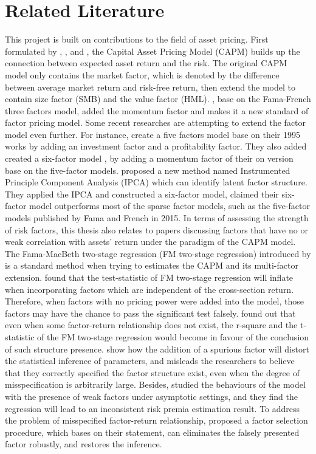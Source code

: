 	\chapter{Related Literature}\label{Literature}
This project is built on contributions to the field of asset pricing.
First formulated by , , and , the Capital Asset Pricing Model (CAPM) builds up the connection between expected asset return and the risk.
The original CAPM model only contains the market factor, which is denoted by the difference between average market return and risk-free return, then extend the model to contain size factor (SMB) and the value factor (HML).
, base on the Fama-French three factors model, added the momentum factor and makes it a new standard of factor pricing model.
Some recent researches are attempting to extend the factor model even further.
For instance,  create a five factors model base on their 1995 works by adding an investment factor and a profitability factor.
They also added created a six-factor model \cite{Fama2018}, by adding a momentum factor of their on version base on the five-factor models.
 proposed a new method named Instrumented Principle Component Analysis (IPCA) which can identify latent factor structure.
They applied the IPCA and constructed a six-factor model, claimed their six-factor model outperforms most of the sparse factor models, such as the five-factor models published by Fama and French in 2015.
In terms of assessing the strength of risk factors, this thesis also relates to papers discussing factors that have no or weak correlation with assets' return under the paradigm of the CAPM model.
The Fama-MacBeth two-stage regression (FM two-stage regression) introduced by  is a standard method when trying to estimates the CAPM and its multi-factor extension. 
 found that the test-statistic of FM two-stage regression will inflate when incorporating factors which are independent of the cross-section return.
Therefore, when factors with no pricing power were added into the model, those factors may have the chance to pass the significant test falsely.
 found out that even when some factor-return relationship does not exist, the r-square and the t-statistic of the FM two-stage regression would become in favour of the conclusion of such structure presence. 
 show how the addition of a spurious factor will distort the statistical inference of parameters, and misleads the researchers to believe that they correctly specified the factor structure exist, even when the degree of misspecification is arbitrarily large.
Besides,  studied the behaviours of the model with the presence of weak factors under asymptotic settings, and they find the regression will lead to an inconsistent risk premia estimation result.
To address the problem of misspecified factor-return relationship,  proposed a factor selection procedure, which bases on their statement, can eliminates the falsely presented factor robustly, and restores the inference. 
	
